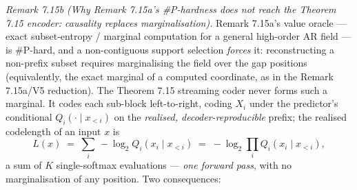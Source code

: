 \documentclass[
]{article}
\begin{document}
\emph{Remark 7.15b (Why Remark 7.15a's \#P-hardness does not reach the
Theorem 7.15 encoder: causality replaces marginalisation).} Remark 7.15a's
value oracle --- exact subset-entropy / marginal computation for a general
high-order AR field --- is \#P-hard, and a non-contiguous support selection
\emph{forces} it: reconstructing a non-prefix subset requires marginalising
the field over the gap positions (equivalently, the exact marginal of a
computed coordinate, as in the Remark 7.15a/V5 reduction). The Theorem 7.15
streaming coder never forms such a marginal. It codes each
sub-block left-to-right, coding $X_i$ under the predictor's conditional
$Q_i(\cdot\mid x_{<i})$ on the \emph{realised, decoder-reproducible} prefix;
the realised codelength of an input $x$ is
\[
L(x)\;=\;\sum_{i}\,-\log_2 Q_i(x_i\mid x_{<i})
\;=\;-\log_2\!\prod_i Q_i(x_i\mid x_{<i}),
\]
a sum of $K$ single-softmax evaluations --- \emph{one forward pass}, with no
marginalisation of any position. Two consequences:
\end{document}
